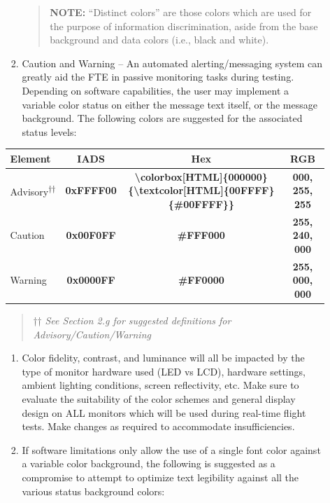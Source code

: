 \documentclass[
]{book}
\providecommand{\tightlist}{%
  \setlength{\itemsep}{0pt}\setlength{\parskip}{0pt}}
\begin{document}
\begin{enumerate}
\begin{enumerate}
\begin{enumerate}
      \begin{quote}
      \textbf{NOTE:} ``Distinct colors'' are those colors which are used for the purpose of information discrimination, aside from the base background and data colors (i.e., black and white).
      \end{quote}
    \item
      Caution and Warning -- An automated alerting/messaging system can greatly aid the FTE in passive monitoring tasks during testing. Depending on software capabilities, the user may implement a variable color status on either the message text itself, or the message background. The following colors are suggested for the associated status levels:
    \end{enumerate}

    \begin{longtable}[]{@{}lccc@{}}
    \toprule
    Element & IADS & Hex & RGB\tabularnewline
    \midrule
    \endhead
    Advisory\textsuperscript{††} & \textbf{\colorbox[HTML]{000000}{\textcolor[HTML]{00FFFF}{0xFFFF00}}} & \textbf{\textbackslash colorbox{[}HTML{]}\{000000\}\{\textbackslash textcolor{[}HTML{]}\{00FFFF\}\{\#00FFFF\}\}} & \textbf{\colorbox[HTML]{000000}{\textcolor[HTML]{00FFFF}{000, 255, 255}}}\tabularnewline
    Caution & \textbf{\colorbox[HTML]{000000}{\textcolor[HTML]{FFF000}{0x00F0FF}}} & \textbf{\colorbox[HTML]{000000}{\textcolor[HTML]{FFF000}{#FFF000}}} & \textbf{\colorbox[HTML]{000000}{\textcolor[HTML]{FFF000}{255, 240, 000}}}\tabularnewline
    Warning & \textbf{\colorbox[HTML]{000000}{\textcolor[HTML]{FF0000}{0x0000FF}}} & \textbf{\colorbox[HTML]{000000}{\textcolor[HTML]{FF0000}{#FF0000}}} & \textbf{\colorbox[HTML]{000000}{\textcolor[HTML]{FF0000}{255, 000, 000}}}\tabularnewline
    \bottomrule
    \end{longtable}

    \begin{quote}
    †† \emph{See Section 2.g for suggested definitions for Advisory/Caution/Warning}
    \end{quote}

    \begin{enumerate}
    \def\labelenumiii{\arabic{enumiii}.}
    \setcounter{enumiii}{8}
    \tightlist
    \item
      Color fidelity, contrast, and luminance will all be impacted by the type of monitor hardware used (LED vs LCD), hardware settings, ambient lighting conditions, screen reflectivity, etc. Make sure to evaluate the suitability of the color schemes and general display design on ALL monitors which will be used during real-time flight tests. Make changes as required to accommodate insufficiencies.
    \item
      If software limitations only allow the use of a single font color against a variable color background, the following is suggested as a compromise to attempt to optimize text legibility against all the various status background colors:
    \end{enumerate}


\end{enumerate}
\end{enumerate}
\end{document}
